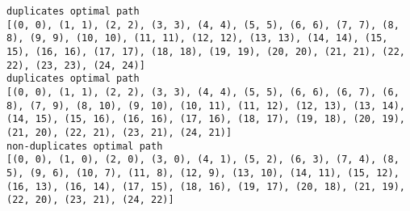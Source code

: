 \documentclass[11pt]{article}
\begin{document}
    \begin{Verbatim}[commandchars=\\\{\}]
duplicates optimal path
[(0, 0), (1, 1), (2, 2), (3, 3), (4, 4), (5, 5), (6, 6), (7, 7), (8, 8), (9, 9), (10, 10), (11, 11), (12, 12), (13, 13), (14, 14), (15, 15), (16, 16), (17, 17), (18, 18), (19, 19), (20, 20), (21, 21), (22, 22), (23, 23), (24, 24)]
duplicates optimal path
[(0, 0), (1, 1), (2, 2), (3, 3), (4, 4), (5, 5), (6, 6), (6, 7), (6, 8), (7, 9), (8, 10), (9, 10), (10, 11), (11, 12), (12, 13), (13, 14), (14, 15), (15, 16), (16, 16), (17, 16), (18, 17), (19, 18), (20, 19), (21, 20), (22, 21), (23, 21), (24, 21)]
non-duplicates optimal path
[(0, 0), (1, 0), (2, 0), (3, 0), (4, 1), (5, 2), (6, 3), (7, 4), (8, 5), (9, 6), (10, 7), (11, 8), (12, 9), (13, 10), (14, 11), (15, 12), (16, 13), (16, 14), (17, 15), (18, 16), (19, 17), (20, 18), (21, 19), (22, 20), (23, 21), (24, 22)]

    \end{Verbatim}

    \begin{center}
    \end{center}
    { \hspace*{\fill} \\}
    
\end{document}
